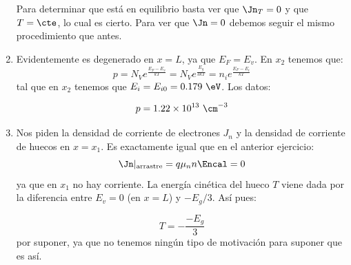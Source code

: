 \begin{enumerate}[label=\alph*)]
		Para determinar que está en equilibrio basta ver que $\Jn_T=0$ y que $T=\cte$, lo cual es cierto. Para ver que $\Jn=0$ debemos seguir el mismo procedimiento que antes.
		\item  Evidentemente es degenerado en $x=L$, ya que $E_F=E_v$. En $x_2$ tenemos que:
		\begin{equation}
			p = N_V e^{\frac{E_F-E_v}{kT}} = N_V e^{\frac{E_g}{3kT}} = n_i e^{\frac{E_F-E_i}{kT}}
		\end{equation}
		tal que en $x_2$ tenemos que $E_i=E_{i0}=0.179 \ \eV$. Los datos:

		\begin{equation}
			p = 1.22 \times 10^{13} \ \cm^{-3}
		\end{equation}
		\item Nos piden la densidad de corriente de electrones $J_n$ y la densidad de corriente de huecos en $x=x_1$. Es exactamente igual que en el anterior ejercicio:
		\begin{equation}
			\Jn|_{\text{{arrastre}}} = q \mu_n n \Encal = 0
		\end{equation}
		ya que en $x_1$ no hay corriente. La energía cinética del hueco $T$ viene dada por la diferencia entre $E_v=0$ (en $x=L$) y $-E_g/3$. Así pues:

		\begin{equation}
			T = - \frac{-E_g}{3}
		\end{equation}
		por suponer, ya que no tenemos ningún tipo de motivación para suponer que es así.

	\end{enumerate}
